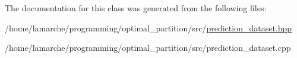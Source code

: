 The documentation for this class was generated from the following files\-:\begin{DoxyCompactItemize}
\item 
/home/lamarche/programming/optimal\-\_\-partition/src/\hyperlink{prediction__dataset_8hpp}{prediction\-\_\-dataset.\-hpp}\item 
/home/lamarche/programming/optimal\-\_\-partition/src/prediction\-\_\-dataset.\-cpp\end{DoxyCompactItemize}
